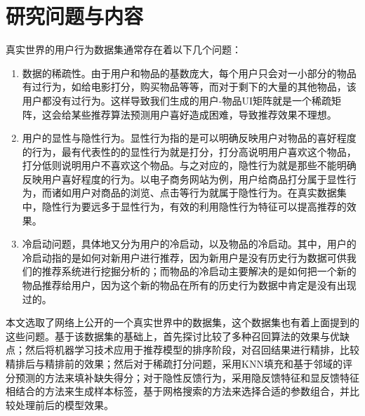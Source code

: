   \section{研究问题与内容}
  真实世界的用户行为数据集通常存在着以下几个问题：
  \begin{enumerate}
    \item 数据的稀疏性。由于用户和物品的基数庞大，每个用户只会对一小部分的物品有过行为，如给电影打分，购买物品等等，而对于剩下的大量的其他物品，该用户都没有过行为。这样导致我们生成的用户-物品UI矩阵就是一个稀疏矩阵，这会给某些推荐算法预测用户喜好造成困难，导致推荐效果不理想。

    \item 用户的显性与隐性行为。显性行为指的是可以明确反映用户对物品的喜好程度的行为，最有代表性的的显性行为就是打分，打分高说明用户喜欢这个物品，打分低则说明用户不喜欢这个物品。与之对应的，隐性行为就是那些不能明确反映用户喜好程度的行为。以电子商务网站为例，用户给商品打分属于显性行为，而诸如用户对商品的浏览、点击等行为就属于隐性行为。在真实数据集中，隐性行为要远多于显性行为，有效的利用隐性行为特征可以提高推荐的效果。

    \item 冷启动问题，具体地又分为用户的冷启动，以及物品的冷启动。其中，用户的冷启动指的是如何对新用户进行推荐，因为新用户是没有历史行为数据可供我们的推荐系统进行挖掘分析的；而物品的冷启动主要解决的是如何把一个新的物品推荐给用户，因为这个新的物品在所有的历史行为数据中肯定是没有出现过的。
  \end{enumerate}

  本文选取了网络上公开的一个真实世界中的数据集，这个数据集也有着上面提到的这些问题。基于该数据集的基础上，首先探讨比较了多种召回算法的效果与优缺点；然后将机器学习技术应用于推荐模型的排序阶段，对召回结果进行精排，比较精排后与精排前的效果；然后对于稀疏打分问题，采用KNN填充和基于邻域的评分预测的方法来填补缺失得分；对于隐性反馈行为，采用隐反馈特征和显反馈特征相结合的方法来生成样本标签，基于网格搜索的方法来选择合适的参数组合，并比较处理前后的模型效果。